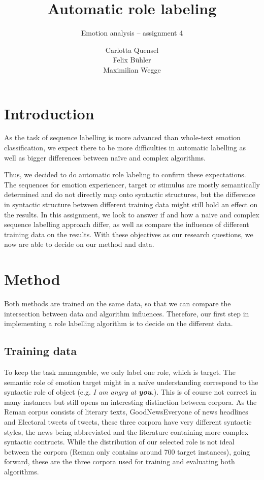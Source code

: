 \documentclass[12pt,pdftex,a4paper]{scrartcl}
\begin{document}
\title{Automatic role labeling}
	\subtitle{Emotion analysis -- assignment 4}
	\author{Carlotta Quensel\\Felix Bühler\\ Maximilian Wegge}
	\maketitle


\section{Introduction}
As the task of sequence labelling is more advanced than whole-text emotion classification, we expect there to be more difficulties in automatic labelling as well as bigger differences between na\"{i}ve and complex algorithms.

Thus, we decided to do automatic role labeling to confirm these expectations. The sequences for emotion experiencer, target or stimulus are mostly semantically determined and do not directly map onto syntactic structures, but the difference in syntactic structure between different training data might still hold an effect on the results. In this assignment, we look to answer if and how a naive and complex sequence labelling approach differ, as well as compare the influence of different training data on the results. With these objectives as our research questions, we now are able to decide on our method and data.

\section{Method}
Both methods are trained on the same data, so that we can compare the intersection between data and algorithm influences. Therefore, our first step in implementing a role labelling algorithm is to decide on the different data.
\subsection{Training data}
To keep the task mamageable, we only label one role, which is target. The semantic role of emotion target might in a na\"{i}ve understanding correspond to the syntactic role of object (e.g. \textit{I am angry at \textbf{you}.}). This is of course not correct in many instances but still opens an interesting distinction between corpora. As the Reman corpus consists of literary texts, GoodNewsEveryone of news headlines and Electoral tweets of tweets, these three corpora have very different syntactic styles, the news being abbreviated and the literature containing more complex syntactic contructs. While the distribution of our selected role is not ideal between the corpora (Reman only contains around 700 target instances), going forward, these are the three corpora used for training and evaluating both algorithms.
\end{document}
